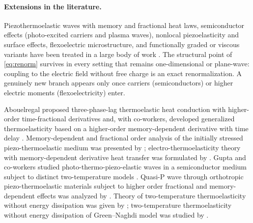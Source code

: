 \paragraph{Extensions in the literature.} Piezothermoelastic waves with memory and fractional heat laws, semiconductor effects (photo-excited carriers and plasma waves), nonlocal piezoelasticity and surface effects, flexoelectric microstructure, and functionally graded or viscous variants have been treated in a large body of work \citep{Gupta2023,Gupta2024a,Gupta2026HeatMap,Das2026,Zang2014,Li2018,Liu2020,Singh2020c,Kumar2024,Kumar2024a,Abouelregal2023,Srivastava2026}. The structural point of \eqref{eq:renorm} survives in every setting that remains one-dimensional or plane-wave: coupling to the electric field without free charge is an exact renormalization. A genuinely new branch appears only once carriers (semiconductors) or higher electric moments (flexoelectricity) enter.

Abouelregal proposed three-phase-lag thermoelastic heat conduction with higher-order time-fractional derivatives \citep{Abouelregal2019} and, with co-workers, developed generalized thermoelasticity based on a higher-order memory-dependent derivative with time delay \citep{Abouelregal2021}. Memory-dependent and fractional order analysis of the initially stressed piezo-thermoelastic medium was presented by \citep{Barak2023a}; electro-thermoelasticity theory with memory-dependent derivative heat transfer was formulated by \citep{Ezzat2016a}. Gupta and co-workers studied photo-thermo-piezo-elastic waves in a semiconductor medium subject to distinct two-temperature models \citep{Gupta2023a}. Quasi-P wave through orthotropic piezo-thermoelastic materials subject to higher order fractional and memory-dependent effects was analyzed by \citep{Gupta2023b}. Theory of two-temperature thermoelasticity without energy dissipation was given by \citep{Youssef2011}; two-temperature thermoelasticity without energy dissipation of Green--Naghdi model was studied by \citep{Youssef2014}.


